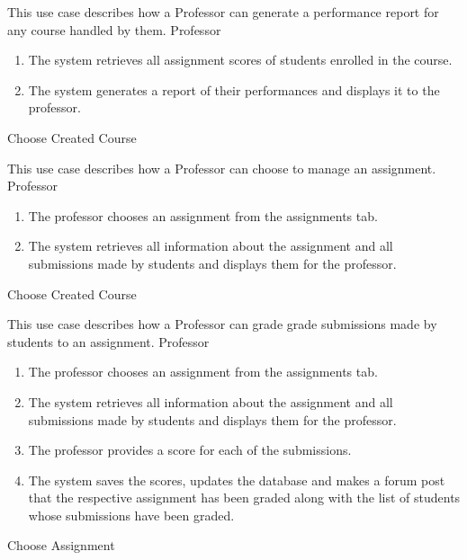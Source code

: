\documentclass[12pt, a4]{report}
\begin{document}

{ %
This use case describes how a Professor can generate a performance report for any course handled by them.
}
{ %
Professor
}
{ %
\begin{enumerate}
    \item The system retrieves all assignment scores of students enrolled in the course.
    \item The system generates a report of their performances and displays it to the professor.
\end{enumerate}
}
{ %
}
{ %
}
{ %
}
{ %
Choose Created Course
}
{ %
}


\newpage
{}
{ %
This use case describes how a Professor can choose to manage an assignment.
}
{ %
Professor
}
{ %
\begin{enumerate}
    \item The professor chooses an assignment from the assignments tab.
    \item The system retrieves all information about the assignment and all submissions made by students and displays them for the professor.
\end{enumerate}
}
{ %
}
{ %
}
{ %
}
{ %
Choose Created Course
}
{ %
}


{ %
This use case describes how a Professor can grade grade submissions made by students to an assignment.
}
{ %
Professor
}
{ %
\begin{enumerate}
    \item The professor chooses an assignment from the assignments tab.
    \item The system retrieves all information about the assignment and all submissions made by students and displays them for the professor.
    \item The professor provides a score for each of the submissions.
    \item The system saves the scores, updates the database and makes a forum post that the respective assignment has been graded along with the list of students whose submissions have been graded.
\end{enumerate}
}
{ %
}
{ %
}
{ %
}
{ %
Choose Assignment
}
{ %
}
\end{document}
